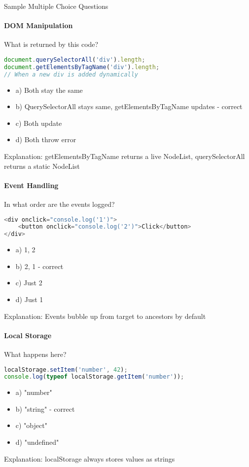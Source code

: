 \begin{KR}{Sample Multiple Choice Questions}

\paragraph{DOM Manipulation}
What is returned by this code?
\begin{lstlisting}[language=JavaScript, style=basesmol]
document.querySelectorAll('div').length;
document.getElementsByTagName('div').length;
// When a new div is added dynamically
\end{lstlisting}
\begin{itemize}
    \item a) Both stay the same
    \item b) QuerySelectorAll stays same, getElementsByTagName updates - correct
    \item c) Both update
    \item d) Both throw error
\end{itemize}
Explanation: getElementsByTagName returns a live NodeList, querySelectorAll returns a static NodeList

\paragraph{Event Handling}
In what order are the events logged?
\begin{lstlisting}[language=JavaScript, style=basesmol]
<div onclick="console.log('1')">
    <button onclick="console.log('2')">Click</button>
</div>
\end{lstlisting}
\begin{itemize}
    \item a) 1, 2
    \item b) 2, 1 - correct
    \item c) Just 2
    \item d) Just 1
\end{itemize}
Explanation: Events bubble up from target to ancestors by default

\paragraph{Local Storage}
What happens here?
\begin{lstlisting}[language=JavaScript, style=basesmol]
localStorage.setItem('number', 42);
console.log(typeof localStorage.getItem('number'));
\end{lstlisting}
\begin{itemize}
    \item a) "number"
    \item b) "string" - correct
    \item c) "object"
    \item d) "undefined"
\end{itemize}
Explanation: localStorage always stores values as strings
\end{KR}

